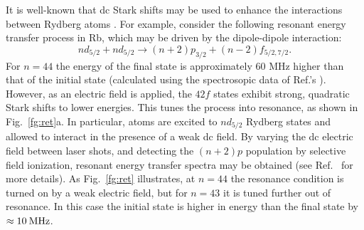 \documentclass[letterpaper,twocolumn,showpacs,preprintnumbers,amsmath,amssymb,prl,nolongbibliography]{revtex4-2}
\begin{document}
It is well-known that dc Stark shifts may be used to enhance
the interactions between Rydberg atoms \cite{safinya:1981,gallagher:1994}.
For example, consider the following resonant energy transfer process in Rb,
which may be driven by the dipole-dipole interaction:
\begin{equation}
nd_{5/2} + nd_{5/2} \rightarrow (n+2)p_{3/2} + (n-2)f_{5/2,7/2}.
\label{eq:process}
\end{equation}
For $n=44$ the energy of the final state is
approximately 60 MHz higher
than that of the initial state (calculated using the
spectrosopic data of Ref.'s \cite{li:2003,han:2006}).
However, as
an electric field is applied, the $42f$ states exhibit strong,
quadratic Stark shifts to lower energies.
This tunes the process into resonance, as shown
in Fig.~\ref{fg:ret}a.
In particular, atoms are excited to
$nd_{5/2}$ Rydberg states and allowed
to interact in the presence of a weak dc field.  By varying the
dc electric field between laser shots, and detecting the $(n+2)p$
population by selective field ionization, resonant energy transfer spectra
may be obtained
(see Ref.~\cite{afrousheh2:2006} for more details).
As Fig.~\ref{fg:ret} illustrates, at $n=44$ the
resonance condition is turned on by a weak electric field, but
for $n=43$ it is tuned further out of resonance. In this
case the initial state is higher in energy than the final
state by $\approx 10 \: {\rm MHz}$.
\end{document}
